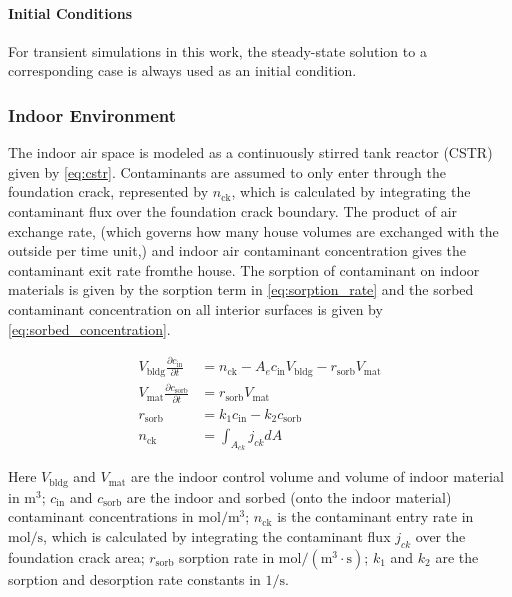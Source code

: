 \paragraph{Initial Conditions}

For transient simulations in this work, the steady-state solution to a corresponding case is always used as an initial condition.

\subsubsection{Indoor Environment}\label{sec:indoor_environment}

The indoor air space is modeled as a continuously stirred tank reactor (CSTR) given by \eqref{eq:cstr}.
Contaminants are assumed to only enter through the foundation crack, represented by $n_\mathrm{ck}$, which is calculated by integrating the contaminant flux over the foundation crack boundary.
The product of air exchange rate, (which governs how many house volumes are exchanged with the outside per time unit,) and indoor air contaminant concentration gives the contaminant exit rate fromthe house.
The sorption of contaminant on indoor materials is given by the sorption term in \eqref{eq:sorption_rate} and the sorbed contaminant concentration on all interior surfaces is given by \eqref{eq:sorbed_concentration}.

\begin{align}
  V_\mathrm{bldg} \frac{\partial c_\mathrm{in}}{\partial t} &= n_\mathrm{ck} - A_e c_\mathrm{in} V_\mathrm{bldg} - r_\mathrm{sorb} V_\mathrm{mat}\label{eq:cstr} \\
  V_\mathrm{mat} \frac{\partial c_\mathrm{sorb}}{\partial t} &= r_\mathrm{sorb} V_\mathrm{mat}\label{eq:sorbed_concentration} \\
  r_\mathrm{sorb} &= k_1 c_\mathrm{in} - k_2 c_\mathrm{sorb}\label{eq:sorption_rate}\\
  n_\mathrm{ck} &= \int_{A_{ck}} j_{ck} dA
\end{align}

Here $V_\mathrm{bldg}$ and $V_\mathrm{mat}$ are the indoor control volume and volume of indoor material in $\mathrm{m^3}$;
$c_\mathrm{in}$ and $c_\mathrm{sorb}$ are the indoor and sorbed (onto the indoor material) contaminant concentrations in $\mathrm{mol/m^3}$;
$n_\mathrm{ck}$ is the contaminant entry rate in $\mathrm{mol/s}$, which is calculated by integrating the contaminant flux $j_{ck}$ over the foundation crack area;
$r_\mathrm{sorb}$ sorption rate in $\mathrm{mol/(m^3 \cdot s)}$;
$k_1$ and $k_2$ are the sorption and desorption rate constants in $\mathrm{1/s}$.\par

